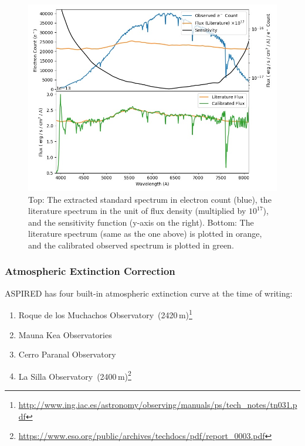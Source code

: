 \documentclass[fleqn,usenatbib]{mnras}
\begin{document}
\begin{figure}
    \centering
    \includegraphics[width=\columnwidth]{fig_06_flux_calibration_diagnostics.jpg}
    \caption{Top: The extracted standard spectrum in electron count
    (blue), the literature spectrum in the unit of flux density (multiplied
    by $10^{17}$), and the sensitivity function (y-axis on the right).
    Bottom: The literature spectrum (same as the one above) is plotted
    in orange, and the calibrated observed spectrum is plotted in green.}
    \label{fig:wavecal}
\end{figure}

\subsubsection*{Atmospheric Extinction Correction}
\textsc{ASPIRED} has four built-in atmospheric extinction curve at the time
of writing:

\begin{enumerate}
    \item Roque de los Muchachos Observatory~(2420\,m)\footnote{\url{http://www.ing.iac.es/astronomy/observing/manuals/ps/tech\_notes/tn031.pdf}}
    \item Mauna Kea Observatories~\citep[4205\,m;][]{2013A&A...549A...8B}
    \item Cerro Paranal Observatory~\citep[2635\,m;][]{2011A&A...527A..91P}
    \item La Silla Observatory~(2400\,m)\footnote{\url{https://www.eso.org/public/archives/techdocs/pdf/report\_0003.pdf}}
\end{enumerate}
\end{document}
